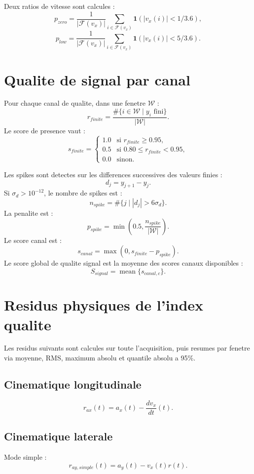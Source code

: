 \documentclass[11pt,a4paper]{article}
\newcommand{\finite}{\mathcal{F}}
\begin{document}
Deux ratios de vitesse sont calcules :
\[
  p_{zero}=\frac{1}{|\finite(v_x)|}\sum_{i\in\finite(v_x)}\mathbf{1}(|v_x(i)|<1/3.6),
\]
\[
  p_{low}=\frac{1}{|\finite(v_x)|}\sum_{i\in\finite(v_x)}\mathbf{1}(|v_x(i)|<5/3.6).
\]

\section{Qualite de signal par canal}

Pour chaque canal de qualite, dans une fenetre $\mathcal{W}$ :
\[
  r_{finite}=\frac{\#\{i\in\mathcal{W}\mid y_i\text{ fini}\}}{|\mathcal{W}|}.
\]
Le score de presence vaut :
\[
  s_{finite}=
  \begin{cases}
    1.0 & \text{si } r_{finite}\ge 0.95,\\
    0.5 & \text{si } 0.80\le r_{finite}<0.95,\\
    0.0 & \text{sinon.}
  \end{cases}
\]

Les spikes sont detectes sur les differences successives des valeurs finies :
\[
  d_j=y_{j+1}-y_j.
\]
Si $\sigma_d>10^{-12}$, le nombre de spikes est :
\[
  n_{spike}=\#\{j\mid |d_j|>6\sigma_d\}.
\]
La penalite est :
\[
  p_{spike}=\min\left(0.5,\frac{n_{spike}}{|\mathcal{W}|}\right).
\]
Le score canal est :
\[
  s_{canal}=\max(0,s_{finite}-p_{spike}).
\]
Le score global de qualite signal est la moyenne des scores canaux disponibles :
\[
  S_{signal}=\operatorname{mean}\{s_{canal,c}\}.
\]

\section{Residus physiques de l'index qualite}

Les residus suivants sont calcules sur toute l'acquisition, puis resumes par fenetre via moyenne, RMS, maximum absolu et quantile absolu a 95\%.

\subsection{Cinematique longitudinale}

\[
  r_{ax}(t)=a_x(t)-\frac{d v_x}{dt}(t).
\]

\subsection{Cinematique laterale}

Mode simple :
\[
  r_{ay,simple}(t)=a_y(t)-v_x(t)r(t).
\]
\end{document}
